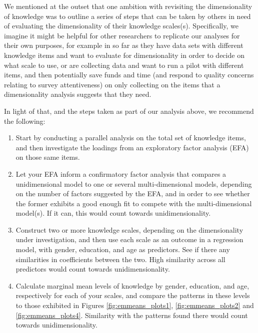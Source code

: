 \documentclass[11pt,halfline,a4paper,]{ouparticle}
\providecommand{\tightlist}{%
  \setlength{\itemsep}{0pt}\setlength{\parskip}{0pt}}
\begin{document}
We mentioned at the outset that one ambition with revisiting the
dimensionality of knowledge was to outline a series of steps that can be
taken by others in need of evaluating the dimensionality of their
knowledge scales(s). Specifically, we imagine it might be helpful for
other researchers to replicate our analyses for their own purposes, for
example in so far as they have data sets with different knowledge items
and want to evaluate for dimensionality in order to decide on what scale
to use, or are collecting data and want to run a pilot with different
items, and then potentially save funds and time (and respond to quality
concerns relating to survey attentiveness) on only collecting on the
items that a dimensionality analysis suggests that they need.

In light of that, and the steps taken as part of our analysis above, we
recommend the following:

\begin{enumerate}
\def\labelenumi{\arabic{enumi}.}
\tightlist
\item
  Start by conducting a parallel analysis on the total set of knowledge
  items, and then investigate the loadings from an exploratory factor
  analysis (EFA) on those same items.\\
\item
  Let your EFA inform a confirmatory factor analysis that compares a
  unidimensional model to one or several multi-dimensional models,
  depending on the number of factors suggested by the EFA, and in order
  to see whether the former exhibits a good enough fit to compete with
  the multi-dimensional model(s). If it can, this would count towards
  unidimensionality.\\
\item
  Construct two or more knowledge scales, depending on the
  dimensionality under investigation, and then use each scale as an
  outcome in a regression model, with gender, education, and age as
  predictors. See if there any similarities in coefficients between the
  two. High similarity across all predictors would count towards
  unidimensionality.\\
\item
  Calculate marginal mean levels of knowledge by gender, education, and
  age, respectively for each of your scales, and compare the patterns in
  these levels to those exhibited in Figures \ref{fig:emmeans_plots1},
  \ref{fig:emmeans_plots2} and \ref{fig:emmeans_plots4}. Similarity with
  the patterns found there would count towards unidimensionality.
\end{enumerate}
\end{document}
